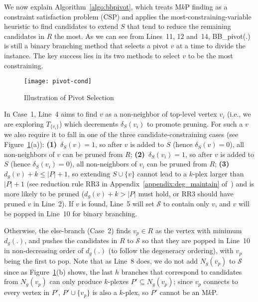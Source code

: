 \documentclass[sigconf, nonacm]{acmart}
\begin{document}
We now explain Algorithm~\ref{algo:bbpivot}, which treats M$k$P finding as a constraint satisfaction problem (CSP) and applies the most-constraining-variable heuristic to find candidates to extend $S$ that tend to reduce the remaining candidates in $R$ the most. As we can see from Lines~11, 12 and~14, BB\_pivot(.) is still a binary branching method that selects a pivot $v$ at a time to divide the instance. The key success lies in its two methods to select $v$ to be the most constraining.

\begin{figure}[t]
\vspace{-7mm}
  \texttt{[image: pivot-cond]}
  \vspace{-2mm}
  \caption{Illustration of Pivot Selection}\label{fig:pivot-cond}
\end{figure}

In Case~1, Line~4 aims to find $v$ as a non-neighbor of top-level vertex $v_i$ (i.e., we are exploring $T_{\{v_i\}}$) which decrements $\delta_S(v_i)$ to promote pruning. For such a $v$ we also require it to fall in one of the three candidate-constraining cases (see Figure~\ref{fig:pivot-cond}(a)): {\bf (1)}~$\delta_S(v)=1$, so after $v$ is added to $S$ (hence $\delta_S(v)=0$), all non-neighbors of $v$ can be pruned from $R$; {\bf (2)}~$\delta_S(v_i)=1$, so after $v$ is added to $S$ (hence $\delta_S(v_i)=0$), all non-neighbors of $v_i$ can be pruned from $R$; {\bf (3)}~$d_g(v)+k\le|P|+1$, so extending $S\cup\{v\}$ cannot lead to a $k$-plex larger than $|P|+1$ (see reduction rule RR3 in Appendix~\ref{appendix:deg_maintain} of~\cite{tech_report}) and is more likely to be pruned ($d_g(v)+k>|P|$ must hold, or RR3 should have pruned $v$ in Line~2). If $v$ is found, Line~5 will set $\mathcal{S}$ to contain only $v$, and $v$ will be popped in Line~10 for binary branching.

Otherwise, the else-branch (Case~2) finds $v_p\in R$ as the vertex with minimum $d_g(.)$, and pushes the candidates in $R$ to $\mathcal{S}$ so that they are popped in Line~10 in non-decreasing order of $d_g(.)$ (to follow the degeneracy ordering), with $v_p$ being the first to pop. Note that as Line~8 does, we do not add $N_g(v_p)$ to $\mathcal{S}$ since as Figure~\ref{fig:pivot-cond}(b) shows, the last $h$ branches that correspond to candidates from $N_g(v_p)$ can only produce $k$-plexes $P'\subseteq N_g(v_p)$; since $v_p$ connects to every vertex in $P'$, $P'\cup\{v_p\}$ is also a $k$-plex, so $P'$ cannot be an M$k$P.
\end{document}
